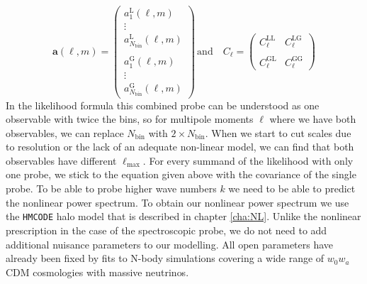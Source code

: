 \documentclass[../main.tex]{subfiles}
\begin{document}
 \begin{equation}
    \boldsymbol{a}(\ell,m) =  \left(\begin{array}{c}
        a^\mathrm{L}_1 (\ell,m) \\
        \vdots \\
        a^\mathrm{L}_{N_\mathrm{bin}}(\ell,m)\\\\
        a^\mathrm{G}_1(\ell,m) \\
        \vdots \\
        a^\mathrm{G}_{N_\mathrm{bin}}(\ell,m)
    \end{array}\right)\,\text{and}\quad C_\ell = \left(\begin{array}{cc}
        C^\mathrm{LL}_\ell &  C^\mathrm{LG}_\ell\\\\
        C^\mathrm{GL}_\ell & C^\mathrm{GG}_\ell
    \end{array} \right)
 \end{equation}
 In the likelihood formula this combined probe can be understood as one observable with twice the bins, so for multipole moments $\ell$ where we have both observables, we can replace $N_\mathrm{bin}$ with $2\times N_\mathrm{bin}$. When we start to cut scales due to resolution or the lack of an adequate non-linear model, we can find that both observables have different $\ell_\mathrm{max}$. For every summand of the likelihood with only one probe, we stick to the equation given above with the covariance of the single probe. 
 To be able to probe higher wave numbers $k$ we need to be able to predict the nonlinear power spectrum. To obtain our nonlinear power spectrum we use the {\tt HMCODE} halo model that is described in chapter \ref{cha:NL}. Unlike the nonlinear prescription in the case of the spectroscopic probe, we do not need to add additional nuisance parameters to our modelling. All open parameters have already been fixed by fits to N-body simulations covering a wide range of $w_0w_a$CDM cosmologies with massive neutrinos.
\end{document}
